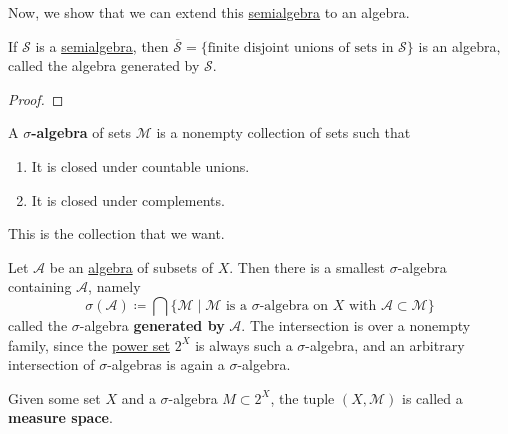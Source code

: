   Now, we show that we can extend this \hyperref[def:semialgebra]{semialgebra} to an algebra. 

	\begin{lemma}
	  \label{thm:semialgebra-to-algebra}
    If $\mathcal{S}$ is a \hyperref[def:semialgebra]{semialgebra}, then $\overline{\mathcal{S}} = \{\text{finite disjoint unions of sets in } \mathcal{S}\}$ is an algebra, called the algebra generated by $\mathcal{S}$. 
  \end{lemma}
  \begin{proof}

  \end{proof}

	\begin{definition}
	  \label{def:sigma-algebra}
 
		A \textbf{$\sigma$-algebra} of sets $\mathcal{M}$ is a nonempty collection of sets such that
		\begin{enumerate}
			\item It is closed under countable unions. 
			\item It is closed under complements. 
		\end{enumerate} 
	\end{definition}

	This is the collection that we want. 

	\begin{lemma}
	  \label{thm:algebra-to-sigma-algebra}
		Let $\mathcal{A}$ be an \hyperref[def:algebra]{algebra} of subsets of $X$. Then there is a smallest $\sigma$-algebra containing $\mathcal{A}$, namely
		\begin{equation}
		  \sigma(\mathcal{A}) \coloneqq \bigcap \{ \mathcal{M} \mid \mathcal{M} \text{ is a } \sigma\text{-algebra on } X \text{ with } \mathcal{A} \subset \mathcal{M} \}
		\end{equation}
		called the $\sigma$-algebra \textbf{generated by} $\mathcal{A}$. The intersection is over a nonempty family, since the \hyperref[alg-ex:power-set]{power set} $2^X$ is always such a $\sigma$-algebra, and an arbitrary intersection of $\sigma$-algebras is again a $\sigma$-algebra. 
	\end{lemma}

	\begin{definition}
	  \label{def:measure-space}
		Given some set $X$ and a $\sigma$-algebra $M \subset 2^X$, the tuple $(X, \mathcal{M})$ is called a \textbf{measure space}. 
	\end{definition}

